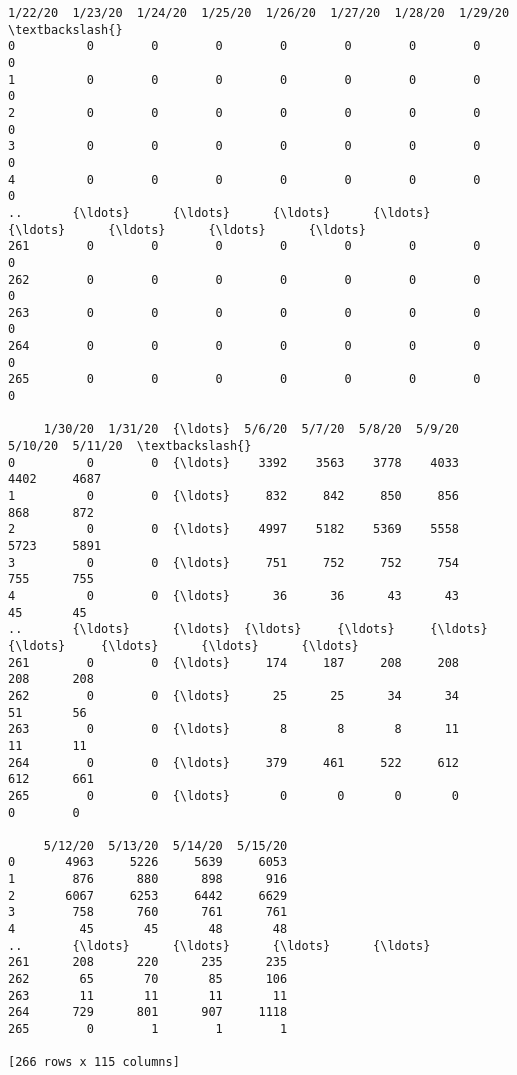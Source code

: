 \documentclass[11pt]{article}
\makeatletter
\newcommand{\boxspacing}{\kern\kvtcb@left@rule\kern\kvtcb@boxsep}
\newcommand{\prompt}[4]{
        \ttfamily\llap{{\color{#2}[#3]:\hspace{3pt}#4}}\vspace{-\baselineskip}
    }
\makeatother
\begin{document}
            \begin{tcolorbox}[breakable, size=fbox, boxrule=.5pt, pad at break*=1mm, opacityfill=0]
\prompt{Out}{outcolor}{12}{\boxspacing}
\begin{Verbatim}[commandchars=\\\{\}]
     1/22/20  1/23/20  1/24/20  1/25/20  1/26/20  1/27/20  1/28/20  1/29/20  \textbackslash{}
0          0        0        0        0        0        0        0        0
1          0        0        0        0        0        0        0        0
2          0        0        0        0        0        0        0        0
3          0        0        0        0        0        0        0        0
4          0        0        0        0        0        0        0        0
..       {\ldots}      {\ldots}      {\ldots}      {\ldots}      {\ldots}      {\ldots}      {\ldots}      {\ldots}
261        0        0        0        0        0        0        0        0
262        0        0        0        0        0        0        0        0
263        0        0        0        0        0        0        0        0
264        0        0        0        0        0        0        0        0
265        0        0        0        0        0        0        0        0

     1/30/20  1/31/20  {\ldots}  5/6/20  5/7/20  5/8/20  5/9/20  5/10/20  5/11/20  \textbackslash{}
0          0        0  {\ldots}    3392    3563    3778    4033     4402     4687
1          0        0  {\ldots}     832     842     850     856      868      872
2          0        0  {\ldots}    4997    5182    5369    5558     5723     5891
3          0        0  {\ldots}     751     752     752     754      755      755
4          0        0  {\ldots}      36      36      43      43       45       45
..       {\ldots}      {\ldots}  {\ldots}     {\ldots}     {\ldots}     {\ldots}     {\ldots}      {\ldots}      {\ldots}
261        0        0  {\ldots}     174     187     208     208      208      208
262        0        0  {\ldots}      25      25      34      34       51       56
263        0        0  {\ldots}       8       8       8      11       11       11
264        0        0  {\ldots}     379     461     522     612      612      661
265        0        0  {\ldots}       0       0       0       0        0        0

     5/12/20  5/13/20  5/14/20  5/15/20
0       4963     5226     5639     6053
1        876      880      898      916
2       6067     6253     6442     6629
3        758      760      761      761
4         45       45       48       48
..       {\ldots}      {\ldots}      {\ldots}      {\ldots}
261      208      220      235      235
262       65       70       85      106
263       11       11       11       11
264      729      801      907     1118
265        0        1        1        1

[266 rows x 115 columns]
\end{Verbatim}
\end{tcolorbox}
        
\end{document}
